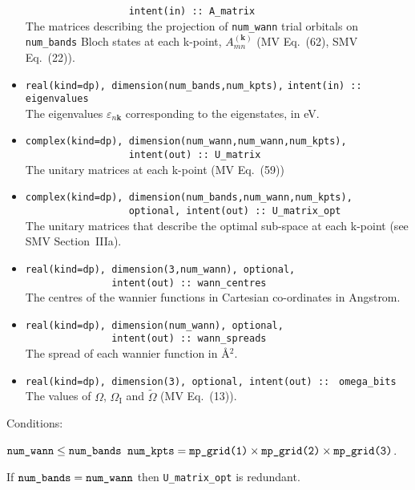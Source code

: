\begin{itemize}
      \verb#                  intent(in) :: A_matrix# \\The matrices
      describing the projection of \verb#num_wann# trial orbitals on
      \verb#num_bands# Bloch states at each k-point,
      $A_{mn}^{(\mathbf{k})}$ (MV Eq.~(62), SMV Eq.~(22)).
\item \verb#real(kind=dp), dimension(num_bands,num_kpts),#
      \verb#intent(in) :: eigenvalues#\\ The
      eigenvalues $\varepsilon_{n\mathbf{k}}$ corresponding to the
      eigenstates, in eV.
\item \verb#complex(kind=dp), dimension(num_wann,num_wann,num_kpts),#\\
      \verb#                  intent(out) :: U_matrix#\\ The unitary
      matrices at each k-point (MV Eq.~(59))
\item \verb#complex(kind=dp), dimension(num_bands,num_wann,num_kpts),#\\
      \verb#                  optional, intent(out) :: U_matrix_opt#\\ The
      unitary matrices that describe the optimal sub-space at each
      k-point (see SMV Section~{\sc IIIa}).
\item \verb#real(kind=dp), dimension(3,num_wann), optional,#\\
      \verb#               intent(out) :: wann_centres#\\ 
      The centres of the wannier
      functions in Cartesian co-ordinates in Angstrom. 
\item \verb#real(kind=dp), dimension(num_wann), optional,#\\
      \verb#               intent(out) :: wann_spreads#\\ 
      The spread of each wannier function in \AA$^{2}$.
\item \verb#real(kind=dp), dimension(3), optional, intent(out) ::#
      \verb# omega_bits#\\ 
      The values of $\Omega$, $\Omega_{\mathrm{I}}$ and
      $\tilde{\Omega}$ (MV Eq.~(13)). 
\end{itemize}

Conditions:
\begin{itemize}
\cond $\verb#num_wann# \le \verb#num_bands#$
\cond $\verb#num_kpts# = \verb#mp_grid(1)# \times \verb#mp_grid(2)#
\times \verb#mp_grid(3)#$.
\end{itemize}

If $\verb#num_bands# = \verb#num_wann#$ then \verb#U_matrix_opt# is
redundant. 

